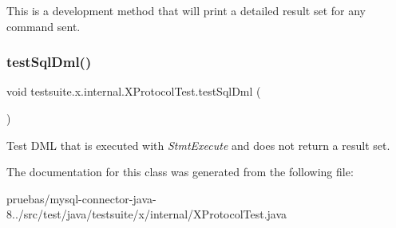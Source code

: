 This is a development method that will print a detailed result set for any command sent. \mbox{\label{classtestsuite_1_1x_1_1internal_1_1_x_protocol_test_a658d506d430cf1654fe86169440bd2a2}} 
\subsubsection{\texorpdfstring{test\+Sql\+Dml()}{testSqlDml()}}
{\footnotesize\ttfamily void testsuite.\+x.\+internal.\+X\+Protocol\+Test.\+test\+Sql\+Dml (\begin{DoxyParamCaption}{ }\end{DoxyParamCaption})}

Test D\+ML that is executed with {\itshape Stmt\+Execute} and does not return a result set. 

The documentation for this class was generated from the following file\+:\begin{DoxyCompactItemize}
\item 
pruebas/mysql-\/connector-\/java-\/8../src/test/java/testsuite/x/internal/X\+Protocol\+Test.\+java\end{DoxyCompactItemize}
